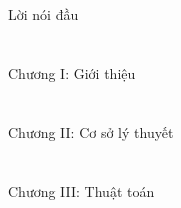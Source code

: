 \documentclass[a4paper, 12pt, twoside]{article}
\begin{document}

\renewcommand{\contentsname}
{\centering\vnmsans\Large\textcolor{vol}{Mục lục}}
{
  \hypersetup{linkcolor=black}
  \tableofcontents
}
\newpage
\section*{\label{preface}} 
{\centering\vnmsans\Large\textcolor{vol}{Lời nói đầu}\par}



\newpage
\section*{\label{epNLP.1}} 
{\centering\vnmsans\Huge\textcolor{vol}{Chương I: Giới thiệu}\par}


\newpage
\section*{\label{epNLP.2}} 
{\centering\vnmsans\Huge\textcolor{vol}{Chương II: Cơ sở lý thuyết}\par}


\newpage
\section*{\label{epNLP.3}} 
{\centering\vnmsans\Huge\textcolor{vol}{Chương III: Thuật toán}\par}


\newpage
% 
\end{document}
